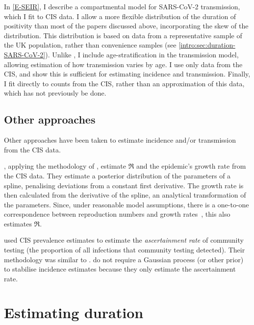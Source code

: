 \documentclass[thesis.tex]{subfiles}
\begin{document}
In \cref{E-SEIR}, I describe a compartmental model for SARS-CoV-2 transmission, which I fit to CIS data.
I allow a more flexible distribution of the duration of positivity than most of the papers discussed above, incorporating the skew of the distribution.
This distribution is based on data from a representative sample of the UK population, rather than convenience samples (see \cref{intro:sec:duration-SARS-CoV-2}).
Unlike \textcite{nicholsonImproving}, I include age-stratification in the transmission model, allowing estimation of how transmission varies by age.
I use only data from the CIS, and show this is sufficient for estimating incidence and transmission.
Finally, I fit directly to counts from the CIS, rather than an approximation of this data, which has not previously be done.

\subsection{Other approaches}

Other approaches have been taken to estimate incidence and/or transmission from the CIS data.

\Textcite{mccabeCISincidence}, applying the methodology of \textcite{ealesAppropriately}, estimate $\Re$ and the epidemic's growth rate from the CIS data.
They estimate a posterior distribution of the parameters of a spline, penalising deviations from a constant first derivative.
The growth rate is then calculated from the derivative of the spline, an analytical transformation of the parameters.
Since, under reasonable model assumptions, there is a one-to-one correspondence between reproduction numbers and growth rates~\autocite{wallingaGI}, this also estimates $\Re$.

\Textcite{colmanAscertainment} used CIS prevalence estimates to estimate the \emph{ascertainment rate} of community testing (the proportion of all infections that community testing detected).
Their methodology was similar to \textcite{abbottCISincidence}.
\Textcite{colmanAscertainment} do not require a Gaussian process (or other prior) to stabilise incidence estimates because they only estimate the ascertainment rate.


\section{Estimating duration} \label{intro:sec:duration}
\end{document}
